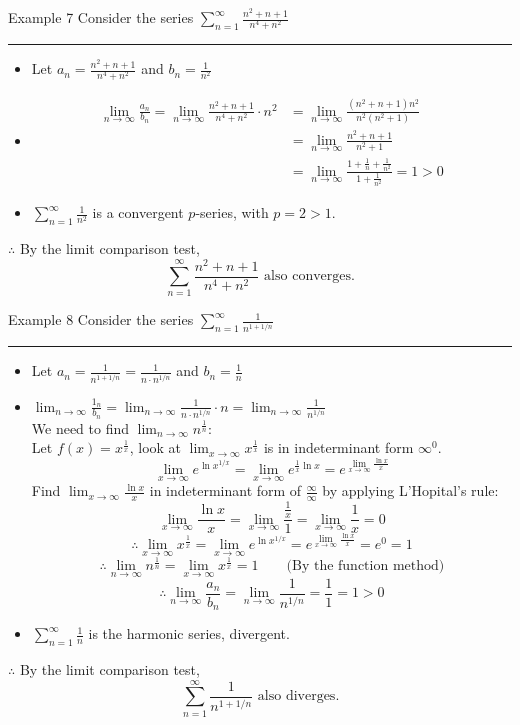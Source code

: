 \documentclass[12pt,a4paper]{article}
\begin{document}
\begin{eg}{Example 7}
	Consider the series $\displaystyle\sum_{n=1}^\infty\frac{n^2+n+1}{n^4+n^2}$\\
	\noindent\rule[0.25\baselineskip]{\textwidth}{1pt}
	\begin{itemize}
		\item Let $\displaystyle a_n=\frac{n^2+n+1}{n^4+n^2}$ and $\displaystyle b_n=\frac{1}{n^2}$
		\item $$\begin{aligned}
					\lim_{n\to\infty}\frac{a_n}{b_n}=\lim_{n\to\infty}\frac{n^2+n+1}{n^4+n^2}\cdot n^2&=\lim_{n\to\infty}\frac{(n^2+n+1)n^2}{n^2(n^2+1)}\\
					&=\lim_{n\to\infty}\frac{n^2+n+1}{n^2+1}\\
					&=\lim_{n\to\infty}\frac{1+\frac{1}{n}+\frac{1}{n^2}}{1+\frac{1}{n^2}}=1>0
				\end{aligned}$$
		\item $\displaystyle \sum_{n=1}^\infty\frac{1}{n^2}$ is a convergent $p$-series, with $p=2>1$.
	\end{itemize}
	$\therefore$ By the limit comparison test, 
	$$\sum_{n=1}^\infty\frac{n^2+n+1}{n^4+n^2}\text{ also converges.}$$
\end{eg}
\begin{eg}{Example 8}
	Consider the series $\displaystyle\sum_{n=1}^\infty\frac{1}{n^{1+1/n}}$\\
	\noindent\rule[0.25\baselineskip]{\textwidth}{1pt}
	\begin{itemize}
		\item Let $\displaystyle a_n=\frac{1}{n^{1+1/n}}=\frac{1}{n\cdot n^{1/n}}$ and $\displaystyle b_n=\frac{1}{n}$
		\item $\displaystyle \lim_{n\to\infty}\frac{1_n}{b_n}=\lim_{n\to\infty}\frac{1}{n\cdot n^{1/n}}\cdot n=\lim_{n\to\infty}\frac{1}{n^{1/n}}$ \\
			We need to find $\displaystyle\lim_{n\to\infty}n^{\frac{1}{n}}:$\\
			Let $f(x)=x^{\frac{1}{x}}$, look at $\displaystyle\lim_{x\to\infty}x^{\frac{1}{x}}$ is in indeterminant form $\infty^0$.
			$$\lim_{x\to\infty}e^{\ln{x^{1/x}}}=\lim_{x\to\infty}e^{\frac{1}{x}\ln{x}}=e^{\lim_{x\to\infty}\frac{\ln{x}}{x}}$$
			Find $\displaystyle\lim_{x\to\infty}\frac{\ln{x}}{x}$ in indeterminant form of $\displaystyle\frac{\infty}{\infty}$ by applying L'Hopital's rule: 
			$$\lim_{x\to\infty}\frac{\ln{x}}{x}=\lim_{x\to\infty}\frac{\frac{1}{x}}{1}=\lim_{x\to\infty}\frac{1}{x}=0$$
			$$\therefore \lim_{x\to\infty}x^{\frac{1}{x}}=\lim_{x\to\infty} e^{\ln{x^{1/x}}}=e^{\lim_{x\to\infty}\frac{\ln{x}}{x}}=e^0=1$$
			$$\therefore\lim_{n\to\infty}n^{\frac{1}{n}}=\lim_{x\to\infty}x^{\frac{1}{x}}=1\qquad\text{(By the function method)}$$
			$$\therefore\lim_{n\to\infty}\frac{a_n}{b_n}=\lim_{n\to\infty}\frac{1}{n^{1/n}}=\frac{1}{1}=1>0$$
		\item $\displaystyle\sum_{n=1}^\infty\frac{1}{n}$ is the harmonic series, divergent.
	\end{itemize}
	$\therefore$ By the limit comparison test, 
	$$\sum_{n=1}^\infty\frac{1}{n^{1+1/n}}\text{ also diverges.}$$
\end{eg}
\end{document}
